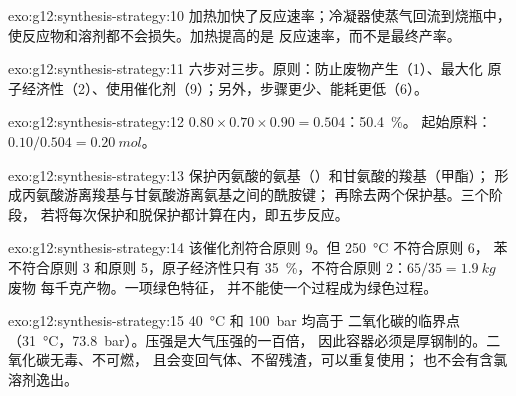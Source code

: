 \begin{solution}{exo:g12:synthesis-strategy:10}
加热加快了反应速率；冷凝器使蒸气回流到烧瓶中，
使反应物和溶剂都不会损失。加热提高的是
反应速率，而不是最终产率。
\end{solution}

\begin{solution}{exo:g12:synthesis-strategy:11}
六步对三步。原则：防止废物产生（1）、最大化
原子经济性（2）、使用催化剂（9）；另外，步骤更少、能耗更低（6）。
\end{solution}

\begin{solution}{exo:g12:synthesis-strategy:12}
$0.80 \times 0.70 \times 0.90 = 0.504$：\qty{50.4}{\percent}。
起始原料：$0.10/0.504 = \qty{0.20}{mol}$。
\end{solution}

\begin{solution}{exo:g12:synthesis-strategy:13}
保护丙氨酸的氨基（）和甘氨酸的羧基（甲酯）；
形成丙氨酸游离羧基与甘氨酸游离氨基之间的酰胺键；
再除去两个保护基。三个阶段，
若将每次保护和脱保护都计算在内，即五步反应。
\end{solution}

\begin{solution}{exo:g12:synthesis-strategy:14}
该催化剂符合原则 9。但 \qty{250}{\celsius} 不符合原则 6，
苯不符合原则 3 和原则 5，原子经济性只有
\qty{35}{\percent}，不符合原则 2：$65/35 = \qty{1.9}{kg}$ 废物
每千克产物。一项绿色特征，
并不能使一个过程成为绿色过程。
\end{solution}

\begin{solution}{exo:g12:synthesis-strategy:15}
\qty{40}{\celsius} 和 \qty{100}{bar} 均高于
二氧化碳的临界点（\qty{31}{\celsius}，\qty{73.8}{bar}）。压强是大气压强的一百倍，
因此容器必须是厚钢制的。二氧化碳无毒、不可燃，
且会变回气体、不留残渣，可以重复使用；
也不会有含氯溶剂逸出。
\end{solution}

